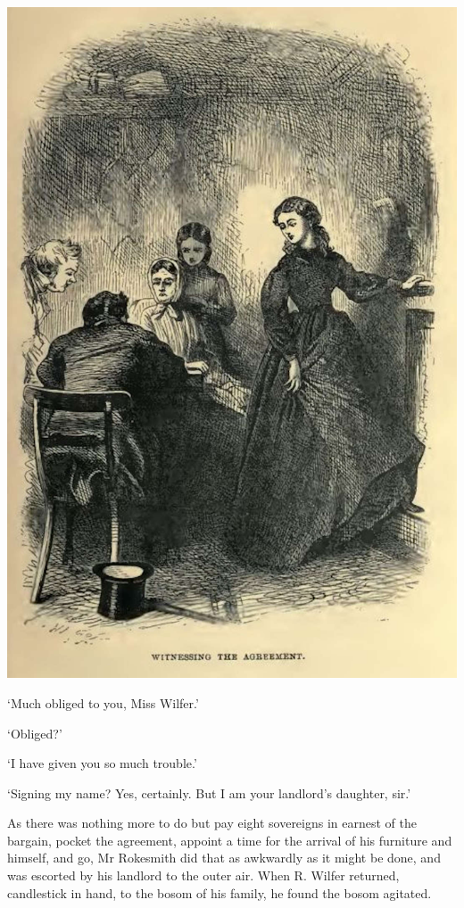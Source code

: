 \includegraphics[scale=1.8]{01-04-01}

‘Much obliged to you, Miss Wilfer.’

‘Obliged?’

‘I have given you so much trouble.’

‘Signing my name? Yes, certainly. But I am your landlord’s daughter,
sir.’

As there was nothing more to do but pay eight sovereigns in earnest of
the bargain, pocket the agreement, appoint a time for the arrival of his
furniture and himself, and go, Mr Rokesmith did that as awkwardly as it
might be done, and was escorted by his landlord to the outer air. When
R. Wilfer returned, candlestick in hand, to the bosom of his family, he
found the bosom agitated.

